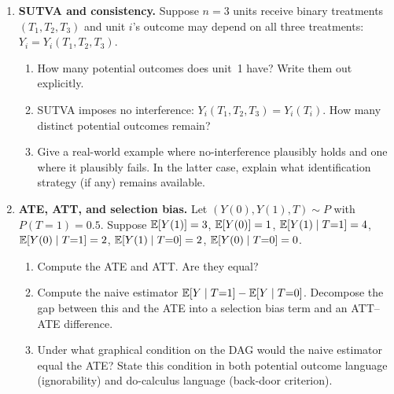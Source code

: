 \documentclass[master.tex]{subfiles}
\begin{document}
\begin{enumerate}[label=\textbf{\arabic*.}, leftmargin=*, itemsep=10pt]

  \item \textbf{SUTVA and consistency.}
  Suppose $n = 3$ units receive binary treatments $(T_1, T_2, T_3)$ and
  unit $i$'s outcome may depend on all three treatments:
  $Y_i = Y_i(T_1, T_2, T_3)$.
  \begin{enumerate}[label=(\alph*)]
    \item How many potential outcomes does unit~1 have?  Write them out
          explicitly.
    \item SUTVA imposes no interference: $Y_i(T_1,T_2,T_3) = Y_i(T_i)$.
          How many distinct potential outcomes remain?
    \item Give a real-world example where no-interference plausibly holds
          and one where it plausibly fails.  In the latter case, explain
          what identification strategy (if any) remains available.
  \end{enumerate}

  \item \textbf{ATE, ATT, and selection bias.}
  Let $(Y(0), Y(1), T) \sim P$ with $P(T{=}1) = 0.5$.  Suppose
  $\mathbb{E}[Y(1)] = 3$, $\mathbb{E}[Y(0)] = 1$, $\mathbb{E}[Y(1) \mid T{=}1] = 4$,
  $\mathbb{E}[Y(0) \mid T{=}1] = 2$, $\mathbb{E}[Y(1) \mid T{=}0] = 2$,
  $\mathbb{E}[Y(0) \mid T{=}0] = 0$.
  \begin{enumerate}[label=(\alph*)]
    \item Compute the ATE and ATT.  Are they equal?
    \item Compute the naive estimator $\mathbb{E}[Y \mid T{=}1] - \mathbb{E}[Y \mid T{=}0]$.
          Decompose the gap between this and the ATE into a selection bias
          term and an ATT--ATE difference.
    \item Under what graphical condition on the DAG would the naive
          estimator equal the ATE?  State this condition in both potential
          outcome language (ignorability) and do-calculus language
          (back-door criterion).
  \end{enumerate}


\end{enumerate}
\end{document}

